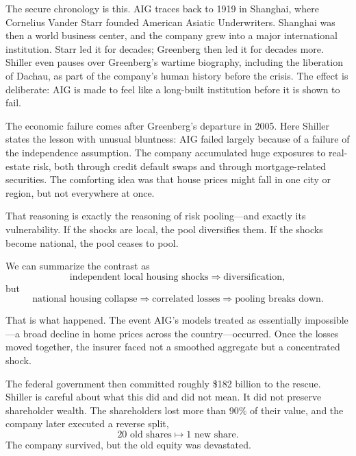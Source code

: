 The secure chronology is this. AIG traces back to 1919 in Shanghai, where Cornelius Vander Starr founded American Asiatic Underwriters. Shanghai was then a world business center, and the company grew into a major international institution. Starr led it for decades; Greenberg then led it for decades more. Shiller even pauses over Greenberg's wartime biography, including the liberation of Dachau, as part of the company's human history before the crisis. The effect is deliberate: AIG is made to feel like a long-built institution before it is shown to fail.

The economic failure comes after Greenberg's departure in 2005. Here Shiller states the lesson with unusual bluntness: AIG failed largely because of a failure of the independence assumption. The company accumulated huge exposures to real-estate risk, both through credit default swaps and through mortgage-related securities. The comforting idea was that house prices might fall in one city or region, but not everywhere at once.

That reasoning is exactly the reasoning of risk pooling---and exactly its vulnerability. If the shocks are local, the pool diversifies them. If the shocks become national, the pool ceases to pool.

We can summarize the contrast as
\begin{equation}
\text{independent local housing shocks} \Longrightarrow \text{diversification},
\end{equation}
but
\begin{equation}
\text{national housing collapse} \Longrightarrow \text{correlated losses} \Longrightarrow \text{pooling breaks down}.
\end{equation}

That is what happened. The event AIG's models treated as essentially impossible---a broad decline in home prices across the country---occurred. Once the losses moved together, the insurer faced not a smoothed aggregate but a concentrated shock.

The federal government then committed roughly \$182 billion to the rescue. Shiller is careful about what this did and did not mean. It did not preserve shareholder wealth. The shareholders lost more than \(90\%\) of their value, and the company later executed a reverse split,
\begin{equation}
20 \text{ old shares} \mapsto 1 \text{ new share}.
\end{equation}
The company survived, but the old equity was devastated.

